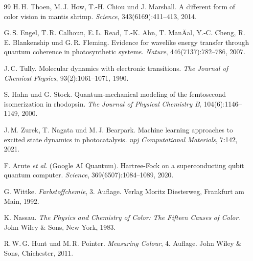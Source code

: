 ﻿\documentclass[a4paper,12pt]{article}
\theoremstyle{definition}
\begin{document}
\begin{thebibliography}{99}
H.\,H. Thoen, M.\,J. How, T.-H. Chiou und J. Marshall.
A different form of color vision in mantis shrimp.
\textit{Science}, 343(6169):411--413, 2014.

G.\,S. Engel, T.\,R. Calhoun, E.\,L. Read, T.-K. Ahn, T. ManÄal, Y.-C. Cheng, R.\,E. Blankenship und G.\,R. Fleming.
Evidence for wavelike energy transfer through quantum coherence in photosynthetic systems.
\textit{Nature}, 446(7137):782--786, 2007.

J.\,C. Tully.
Molecular dynamics with electronic transitions.
\textit{The Journal of Chemical Physics}, 93(2):1061--1071, 1990.

S. Hahn und G. Stock.
Quantum-mechanical modeling of the femtosecond isomerization in rhodopsin.
\textit{The Journal of Physical Chemistry B}, 104(6):1146--1149, 2000.

J.\,M. Zurek, T. Nagata und M.\,J. Bearpark.
Machine learning approaches to excited state dynamics in photocatalysis.
\textit{npj Computational Materials}, 7:142, 2021.

F. Arute \textit{et al.} (Google AI Quantum).
Hartree-Fock on a superconducting qubit quantum computer.
\textit{Science}, 369(6507):1084--1089, 2020.

G. Wittke.
\textit{Farbstoffchemie}, 3. Auflage.
Verlag Moritz Diesterweg, Frankfurt am Main, 1992.

K. Nassau.
\textit{The Physics and Chemistry of Color: The Fifteen Causes of Color}.
John Wiley \& Sons, New York, 1983.

R.\,W.\,G. Hunt und M.\,R. Pointer.
\textit{Measuring Colour}, 4. Auflage.
John Wiley \& Sons, Chichester, 2011.

\end{thebibliography}
\end{document}
